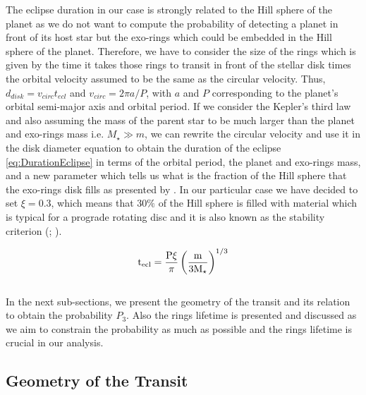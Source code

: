 The eclipse duration in our case is strongly related to the Hill sphere of the planet as we do not want to compute the probability of detecting a planet in front of its host star but the exo-rings which could be embedded in the Hill sphere of the planet. Therefore, we have to consider the size of the rings which is given by the time it takes those rings to transit in front of the stellar disk times the orbital velocity assumed to be the same as the circular velocity. Thus, $d_{disk} = v_{circ} t_{ecl}$ and $v_{circ} = 2\pi a/P$, with $a$ and $P$ corresponding to the planet's orbital semi-major axis and orbital period. If we consider the Kepler's third law and also assuming the mass of the parent star to be much larger than the planet and exo-rings mass i.e. $M_\star \gg m$, we can rewrite the circular velocity and use it in the disk diameter equation to obtain the duration of the eclipse \autoref{eq:DurationEclipse} in terms of the orbital period, the planet and exo-rings mass, and a new parameter which tells us what is the fraction of the Hill sphere that the exo-rings disk fills as presented by \citeyear{2017MNRAS.471..740O}. In our particular case we have decided to set $\xi = 0.3$, which means that $30\%$ of the Hill sphere is filled with material which is typical for a prograde rotating disc and it is also known as the stability criterion (\citeyear{1998ApJ...508..707Q}; \citeyear{2003AJ....126..398N}).

\begingroup
\Large
\begin{equation}
\textnormal{t}_{\textnormal{ecl}} = \frac{\textnormal{P} \xi}{\pi} \left( \frac{\textnormal{m}}{3\textnormal{M}_\star} \right)^{1/3}
 \label{eq:DurationEclipse}
\end{equation}
\endgroup\\

In the next sub-sections, we present the geometry of the transit and its relation to obtain the probability $P_3$. Also the rings lifetime is presented and discussed as we aim to constrain the probability as much as possible and the rings lifetime is crucial in our analysis.   

\subsection{Geometry of the Transit}\label{subsec:GeometryTransit}

